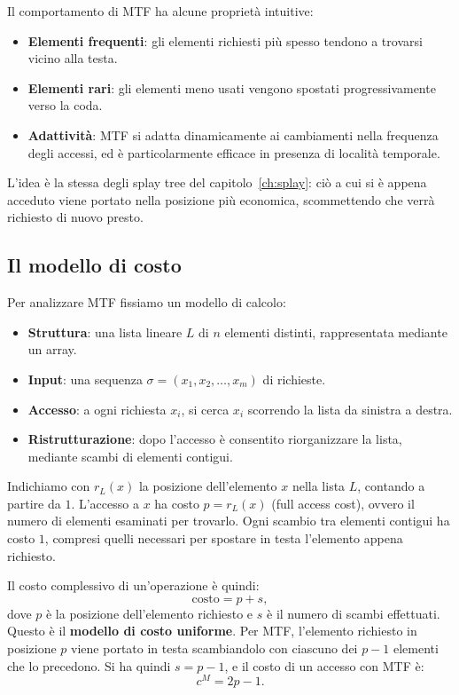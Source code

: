 Il comportamento di MTF ha alcune proprietà intuitive:
\begin{itemize}
    \item \textbf{Elementi frequenti}: gli elementi richiesti più spesso tendono a trovarsi vicino alla testa.
    \item \textbf{Elementi rari}: gli elementi meno usati vengono spostati progressivamente verso la coda.
    \item \textbf{Adattività}: MTF si adatta dinamicamente ai cambiamenti nella frequenza degli accessi, ed è particolarmente efficace in presenza di località temporale.
\end{itemize}
L'idea è la stessa degli splay tree del capitolo~\ref{ch:splay}: ciò a cui si è appena acceduto viene portato nella posizione più economica, scommettendo che verrà richiesto di nuovo presto.

\subsection{Il modello di costo}\label{sec:mtf-costo}
Per analizzare MTF fissiamo un modello di calcolo:
\begin{itemize}
    \item \textbf{Struttura}: una lista lineare $L$ di $n$ elementi distinti, rappresentata mediante un array.
    \item \textbf{Input}: una sequenza $\sigma = (x_1, x_2, \dots, x_m)$ di richieste.
    \item \textbf{Accesso}: a ogni richiesta $x_i$, si cerca $x_i$ scorrendo la lista da sinistra a destra.
    \item \textbf{Ristrutturazione}: dopo l'accesso è consentito riorganizzare la lista, mediante scambi di elementi contigui.
\end{itemize}

Indichiamo con $r_L(x)$ la posizione dell'elemento $x$ nella lista $L$, contando a partire da $1$. L'accesso a $x$ ha costo $p = r_L(x)$ (full access cost), ovvero il numero di elementi esaminati per trovarlo. Ogni scambio tra elementi contigui ha costo $1$, compresi quelli necessari per spostare in testa l'elemento appena richiesto.

Il costo complessivo di un'operazione è quindi:
\[
\text{costo} = p + s,
\]
dove $p$ è la posizione dell'elemento richiesto e $s$ è il numero di scambi effettuati. Questo è il \textbf{modello di costo uniforme}. Per MTF, l'elemento richiesto in posizione $p$ viene portato in testa scambiandolo con ciascuno dei $p-1$ elementi che lo precedono. Si ha quindi $s = p - 1$, e il costo di un accesso con MTF è:
\[
c^M = 2p - 1.
\]

